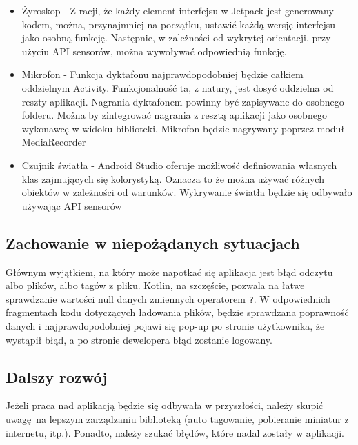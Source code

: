 \begin{itemize}
	\item Żyroskop - Z racji, że każdy element interfejsu w Jetpack jest generowany kodem, można, przynajmniej na początku, ustawić każdą wersję interfejsu jako osobną funkcję. Następnie, w zależności od wykrytej orientacji, przy użyciu API sensorów\cite{doc_sensorapi}, można wywoływać odpowiednią funkcję.
	
	\item Mikrofon - Funkcja dyktafonu najprawdopodobniej będzie całkiem oddzielnym Activity. Funkcjonalność ta, z natury, jest dosyć oddzielna od reszty aplikacji. Nagrania dyktafonem powinny być zapisywane do osobnego folderu. Można by zintegrować nagrania z resztą aplikacji jako osobnego wykonawcę w widoku biblioteki. Mikrofon będzie nagrywany poprzez moduł MediaRecorder\cite{doc_mediarecorder}

	\item Czujnik światła - Android Studio oferuje możliwość definiowania własnych klas zajmujących się kolorystyką. Oznacza to że można używać różnych obiektów w zależności od warunków. Wykrywanie światła będzie się odbywało używając API sensorów\cite{doc_sensorapi}
\end{itemize}


\subsection{Zachowanie w niepożądanych sytuacjach}

Głównym wyjątkiem, na który może napotkać się aplikacja jest błąd odczytu albo plików, albo tagów z pliku. Kotlin, na szczęście, pozwala na łatwe sprawdzanie wartości null danych zmiennych operatorem \texttt{?}. W odpowiednich fragmentach kodu dotyczących ładowania plików, będzie sprawdzana poprawność danych i najprawdopodobniej pojawi się pop-up po stronie użytkownika, że wystąpił błąd, a po stronie dewelopera błąd zostanie logowany.

\subsection{Dalszy rozwój}

Jeżeli praca nad aplikacją będzie się odbywała w przyszłości, należy skupić uwagę na lepszym zarządzaniu biblioteką (auto tagowanie, pobieranie miniatur z internetu, itp.). Ponadto, należy szukać błędów, które nadal zostały w aplikacji.
